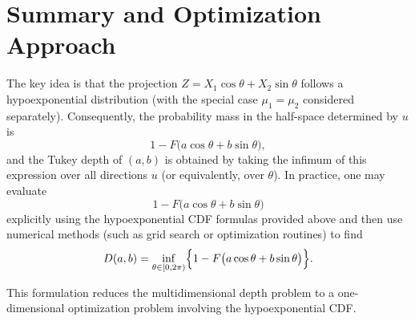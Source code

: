 \section{Summary and Optimization Approach}

The key idea is that the projection \(Z = X_1\cos\theta+X_2\sin\theta\) follows a hypoexponential distribution (with the special case \(\mu_1=\mu_2\) considered separately). Consequently, the probability mass in the half-space determined by \(u\) is 
\[
1-F\bigl(a\cos\theta+b\sin\theta\bigr),
\]
and the Tukey depth of \((a,b)\) is obtained by taking the infimum of this expression over all directions \(u\) (or equivalently, over \(\theta\)). In practice, one may evaluate
\[
1-F\bigl(a\cos\theta+b\sin\theta\bigr)
\]
explicitly using the hypoexponential CDF formulas provided above and then use numerical methods (such as grid search or optimization routines) to find
\[
D(a,b)= \inf_{\theta\in[0,2\pi)}\Bigl\{1-F\bigl(a\cos\theta+b\sin\theta\bigr)\Bigr\}.
\]

This formulation reduces the multidimensional depth problem to a one-dimensional optimization problem involving the hypoexponential CDF.

